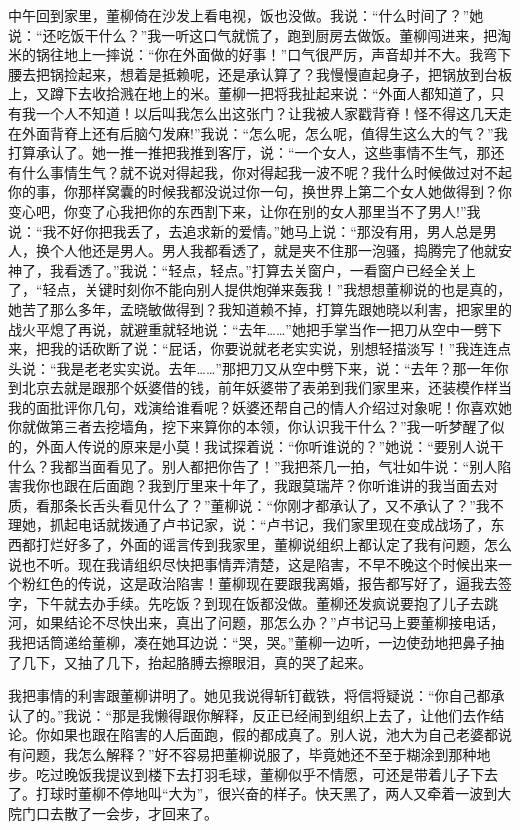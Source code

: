 \documentclass[12pt,oneside]{book}
\begin{document}
中午回到家里，董柳倚在沙发上看电视，饭也没做。我说：``什么时间了？''她说：``还吃饭干什么？''我一听这口气就慌了，跑到厨房去做饭。董柳闯进来，把淘米的锅往地上一摔说：``你在外面做的好事！''口气很严厉，声音却并不大。我弯下腰去把锅捡起来，想着是抵赖呢，还是承认算了？我慢慢直起身子，把锅放到台板上，又蹲下去收拾溅在地上的米。董柳一把将我扯起来说：``外面人都知道了，只有我一个人不知道！以后叫我怎么出这张门？让我被人家戳背脊！怪不得这几天走在外面背脊上还有后脑勺发麻!''我说：``怎么呢，怎么呢，值得生这么大的气？''我打算承认了。她一推一推把我推到客厅，说：``一个女人，这些事情不生气，那还有什么事情生气？就不说对得起我，你对得起我一波不呢？我什么时候做过对不起你的事，你那样窝囊的时候我都没说过你一句，换世界上第二个女人她做得到？你变心吧，你变了心我把你的东西割下来，让你在别的女人那里当不了男人!''我说：``我不好你把我丢了，去追求新的爱情。''她马上说：``那没有用，男人总是男人，换个人他还是男人。男人我都看透了，就是夹不住那一泡骚，捣腾完了他就安神了，我看透了。''我说：``轻点，轻点。''打算去关窗户，一看窗户已经全关上了，``轻点，关键时刻你不能向别人提供炮弹来轰我！''我想想董柳说的也是真的，她苦了那么多年，孟晓敏做得到？我知道赖不掉，打算先跟她晓以利害，把家里的战火平熄了再说，就避重就轻地说：``去年\ldots\ldots{}''她把手掌当作一把刀从空中一劈下来，把我的话砍断了说：``屁话，你要说就老老实实说，别想轻描淡写！''我连连点头说：``我是老老实实说。去年\ldots\ldots{}''那把刀又从空中劈下来，说：``去年？那一年你到北京去就是跟那个妖婆借的钱，前年妖婆带了表弟到我们家里来，还装模作样当我的面批评你几句，戏演给谁看呢？妖婆还帮自己的情人介绍过对象呢！你喜欢她你就做第三者去挖墙角，挖下来算你的本领，你认识我干什么？''我一听梦醒了似的，外面人传说的原来是小莫！我试探着说：``你听谁说的？''她说：``要别人说干什么？我都当面看见了。别人都把你告了！''我把茶几一拍，气壮如牛说：``别人陷害我你也跟在后面跑？我到厅里来十年了，我跟莫瑞芹？你听谁讲的我当面去对质，看那条长舌头看见什么了？''董柳说：``你刚才都承认了，又不承认了？''我不理她，抓起电话就拨通了卢书记家，说：``卢书记，我们家里现在变成战场了，东西都打烂好多了，外面的谣言传到我家里，董柳说组织上都认定了我有问题，怎么说也不听。现在我请组织尽快把事情弄清楚，这是陷害，不早不晚这个时候出来一个粉红色的传说，这是政治陷害！董柳现在要跟我离婚，报告都写好了，逼我去签字，下午就去办手续。先吃饭？到现在饭都没做。董柳还发疯说要抱了儿子去跳河，如果结论不尽快出来，真出了问题，那怎么办？''卢书记马上要董柳接电话，我把话筒递给董柳，凑在她耳边说：``哭，哭。''董柳一边听，一边使劲地把鼻子抽了几下，又抽了几下，抬起胳膊去擦眼泪，真的哭了起来。

我把事情的利害跟董柳讲明了。她见我说得斩钉截铁，将信将疑说：``你自己都承认了的。''我说：``那是我懒得跟你解释，反正已经闹到组织上去了，让他们去作结论。你如果也跟在陷害的人后面跑，假的都成真了。别人说，池大为自己老婆都说有问题，我怎么解释？''好不容易把董柳说服了，毕竟她还不至于糊涂到那种地步。吃过晚饭我提议到楼下去打羽毛球，董柳似乎不情愿，可还是带着儿子下去了。打球时董柳不停地叫``大为''，很兴奋的样子。快天黑了，两人又牵着一波到大院门口去散了一会步，才回来了。
\end{document}
